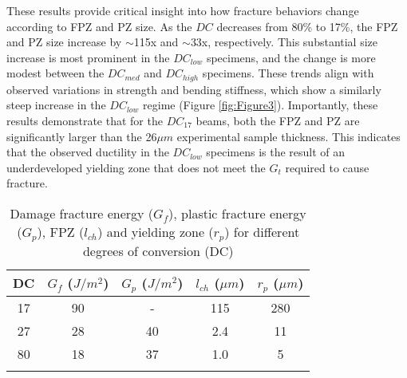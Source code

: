 \documentclass[11pt]{article}
\providecommand{\Jms}[0]{$J/m^2$}
\providecommand{\um}[0]{$\mu m$}
\providecommand{\rp}[0]{$r_p$}
\providecommand{\lch}[0]{$l_{ch}$}
\providecommand{\DC}[0]{$DC$}
\providecommand{\DClow}[0]{$DC_{low}$}
\providecommand{\DCmed}[0]{$DC_{med}$}
\providecommand{\DChi}[0]{$DC_{high}$}
\providecommand{\DCi}[0]{$DC_{17}$}
\providecommand{\Gt}[0]{$G_{t}$}
\providecommand{\Gp}[0]{$G_{p}$}
\providecommand{\Gf}[0]{$G_{f}$}
\begin{document}
        These results provide critical insight into how fracture behaviors change according to FPZ and PZ size.
        As the \DC{} decreases from 80\% to 17\%, the FPZ and PZ size increase by $\sim$115x and $\sim$33x, respectively.
        This substantial size increase is most prominent in the \DClow{} specimens, and the change is more modest between the \DCmed{} and \DChi{} specimens.
        These trends align with observed variations in strength and bending stiffness, which show a similarly steep increase in the \DClow{} regime (Figure \ref{fig:Figure3}).
        Importantly, these results demonstrate that for the \DCi{} beams, both the FPZ and PZ are significantly larger than the 26\um{} experimental sample thickness.
        This indicates that the observed ductility in the \DClow{} specimens is the result of an underdeveloped yielding zone that does not meet the \Gt{} required to cause fracture.

        \begin{table} [h!]
            \centering
            \caption{Damage fracture energy (\Gf{}), plastic fracture energy (\Gp{}), FPZ (\lch{}) and yielding zone (\rp{}) for different degrees of conversion (DC)}
            \begin{tabular}{ccccc}
                DC  &   \Gf{} (\Jms{})  &   \Gp{} (\Jms{})  &   \lch{} (\um{})  &   \rp{} (\um{})\\
                \midrule
                17  &       90          &       -           &       115         &       280 \\
                27  &       28          &       40          &       2.4         &       11 \\
                80  &       18          &       37          &       1.0         &       5 \\
                \label{Table1}
            \end{tabular}
        \end{table}
        
\end{document}
